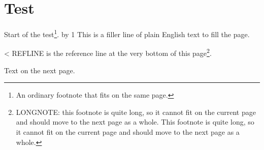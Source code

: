\documentclass{book}
\begin{document}
\chapter{Test}
Start of the test\footnote{An ordinary footnote that fits on the same page.}.
\newcount\mycount {}
\loop
  \advance\mycount by 1
  This is a filler line of plain English text to fill the page.\par
\ifnum\mycount<\FILLN \repeat
REFLINE is the reference line at the very bottom of this page\footnote{LONGNOTE: this footnote is quite long, so it cannot fit on the current page and should move to the next page as a whole. This footnote is quite long, so it cannot fit on the current page and should move to the next page as a whole.}.

Text on the next page.
\end{document}
